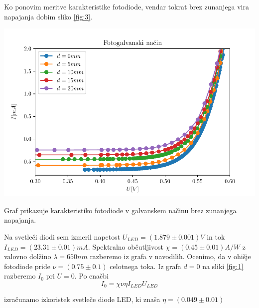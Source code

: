 \documentclass[12pt]{report}
\begin{document}
Ko ponovim meritve karakteristike fotodiode, vendar tokrat brez zunanjega vira napajanja dobim sliko \ref{fig:3}. 

\begin{slika}[H]
  \centering
  \includegraphics{galvanski}
  \caption{\small Graf prikazuje karakteristiko fotodiode v galvanskem načinu brez zunanjega napajanja.}
  \label{fig:3}
\end{slika}

Na svetleči diodi sem izmeril napetost $U_{LED} = (1.879 \pm 0.001)V$ in tok $I_{LED} = (23.31 \pm 0.01)mA$. Spektralno občutljivost $\chi = (0.45 \pm 0.01)A/W$ z valovno dolžino $\lambda = 650nm$ razberemo iz grafa v navodilih. Ocenimo, da v ohišje fotodiode pride $\nu = (0.75 \pm 0.1)$ celotnega toka. Iz grafa $d=0$ na sliki \ref{fig:1} razberemo $I_0$ pri $U = 0$. Po enačbi 
\begin{equation}
  I_0 = \chi \nu \eta I_{LED} U_{LED}
\end{equation}

izračunamo izkoristek svetleče diode LED, ki znaša $\eta = (0.049 \pm 0.01)$
\end{document}
